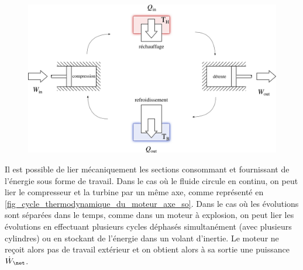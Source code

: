 		\begin{figure}
			\begin{center}
				\includegraphics[width=\textwidth]{images/moteur_sf.png}
			\end{center}
			\label{fig_cycle_thermodynamique_du_moteur_sf}
		\end{figure}

		Il est possible de lier mécaniquement les sections consommant et fournissant de l’énergie sous forme de travail. Dans le cas où le fluide circule en continu, on peut lier le compresseur et la turbine par un même axe, comme représenté en \cref{fig_cycle_thermodynamique_du_moteur_axe_so}. Dans le cas où les évolutions sont séparées dans le temps, comme dans un moteur à explosion, on peut lier les évolutions en effectuant plusieurs cycles déphasés simultanément (avec plusieurs cylindres) ou en stockant de l’énergie dans un volant d’inertie. Le moteur ne reçoit alors pas de travail extérieur et on obtient alors  à sa sortie une puissance $\dot W_\net$.

